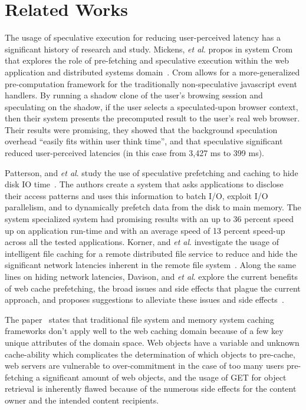 \section{Related Works}
\label{sec:related}
The usage of speculative execution for reducing user-perceived latency has a
significant history of research and study. 
Mickens, {\it et al}. propos in system Crom that 
explores the role of pre-fetching and speculative execution within the web
application and distributed systems domain~\cite{crom}. Crom allows for a
more-generalized pre-computation framework for the traditionally non-speculative
javascript event handlers. By running a shadow clone of the user's browsing
session and speculating on the shadow, if the user selects a speculated-upon
browser context, then their system presents the precomputed result to the user's
real web browser. Their results were promising, they showed that the background
speculation overhead ``easily fits within user think time'', and that  speculative
significant reduced user-perceived latencies (in this case from 3,427 ms to 399
ms).

Patterson, and {\it et al}. study the use of speculative prefetching and caching
to hide disk IO time~\cite{diskio}.  The authors create a system that asks
applications to disclose their access patterns and uses this information to
batch I/O, exploit I/O parallelism, and to dynamically prefetch data from the
disk to main memory. The system specialized system had promising results with an
up to 36 percent speed up on application run-time and with an average speed of
13 percent speed-up across all the tested applications. 
Korner, and {\it et al}. investigate the usage of intelligent file caching for a
remote distributed file service to reduce and hide the significant network
latencies inherent in the remote file system~\cite{korner}.
Along the same lines on hiding network latencies, Davison, and {\it et al}. explore
the current benefits of web cache prefetching, the broad issues and side effects
that plague the current approach, and proposes suggestions to alleviate these
issues and side effects~\cite{davison}.

The paper~\cite{davison} states that traditional file system and memory system
caching frameworks don't apply well to the web caching domain because of a few
key unique attributes of the domain space. Web objects have a variable and
unknown cache-ability which complicates the determination of which objects to
pre-cache, web servers are vulnerable to over-commitment in the case of too many
users pre-fetching a significant amount of web objects, and the usage of GET for
object retrieval is inherently flawed because of the numerous side effects for
the content owner and the intended content recipients.

